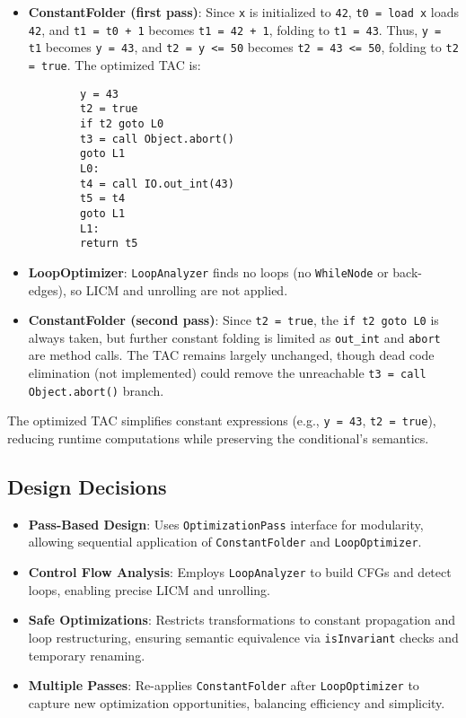 \documentclass[11pt, titlepage]{article}
\begin{document}
\begin{itemize}[leftmargin=*]
    \item \textbf{ConstantFolder (first pass)}: Since \texttt{x} is initialized to \texttt{42}, \texttt{t0 = load x} loads \texttt{42}, and \texttt{t1 = t0 + 1} becomes \texttt{t1 = 42 + 1}, folding to \texttt{t1 = 43}. Thus, \texttt{y = t1} becomes \texttt{y = 43}, and \texttt{t2 = y <= 50} becomes \texttt{t2 = 43 <= 50}, folding to \texttt{t2 = true}. The optimized TAC is:
        \begin{lstlisting}
        y = 43
        t2 = true
        if t2 goto L0
        t3 = call Object.abort()
        goto L1
        L0:
        t4 = call IO.out_int(43)
        t5 = t4
        goto L1
        L1:
        return t5
        \end{lstlisting}
    \item \textbf{LoopOptimizer}: \texttt{LoopAnalyzer} finds no loops (no \texttt{WhileNode} or back-edges), so LICM and unrolling are not applied.
    \item \textbf{ConstantFolder (second pass)}: Since \texttt{t2 = true}, the \texttt{if t2 goto L0} is always taken, but further constant folding is limited as \texttt{out\_int} and \texttt{abort} are method calls. The TAC remains largely unchanged, though dead code elimination (not implemented) could remove the unreachable \texttt{t3 = call Object.abort()} branch.
\end{itemize}

The optimized TAC simplifies constant expressions (e.g., \texttt{y = 43}, \texttt{t2 = true}), reducing runtime computations while preserving the conditional's semantics.

\subsection{Design Decisions}
\begin{itemize}[leftmargin=*]
    \item \textbf{Pass-Based Design}: Uses \texttt{OptimizationPass} interface for modularity, allowing sequential application of \texttt{ConstantFolder} and \texttt{LoopOptimizer}.
    \item \textbf{Control Flow Analysis}: Employs \texttt{LoopAnalyzer} to build CFGs and detect loops, enabling precise LICM and unrolling.
    \item \textbf{Safe Optimizations}: Restricts transformations to constant propagation and loop restructuring, ensuring semantic equivalence via \texttt{isInvariant} checks and temporary renaming.
    \item \textbf{Multiple Passes}: Re-applies \texttt{ConstantFolder} after \texttt{LoopOptimizer} to capture new optimization opportunities, balancing efficiency and simplicity.
\end{itemize}
\end{document}
